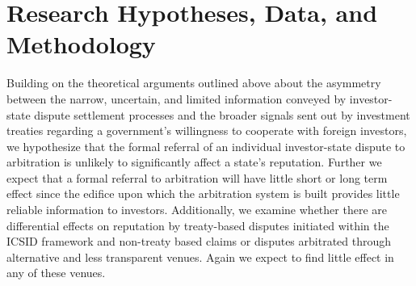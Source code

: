 \documentclass[12pt,onesided]{amsart}
\begin{document}

\section*{Research Hypotheses, Data, and Methodology}

Building on the theoretical arguments outlined above about the asymmetry between the narrow, uncertain, and limited information conveyed by investor-state dispute settlement processes and the broader signals sent out by investment treaties regarding a government's willingness to cooperate with foreign investors, we hypothesize that the formal referral of an individual investor-state dispute to arbitration is unlikely to significantly affect a state's reputation. Further we expect that a formal referral to arbitration will have little short or long term effect since the edifice upon which the arbitration system is built provides little reliable information to investors. Additionally, we examine whether there are differential effects on reputation by treaty-based disputes initiated within the ICSID framework and non-treaty based claims or disputes arbitrated through alternative and less transparent venues. Again we expect to find little effect in any of these venues.
\end{document}
